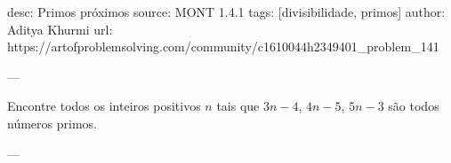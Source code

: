 desc: Primos próximos
source:  MONT 1.4.1
tags:  [divisibilidade, primos]
author:  Aditya Khurmi
url:  https://artofproblemsolving.com/community/c1610044h2349401_problem_141

---

Encontre todos os inteiros positivos $n$ tais que $3n - 4$, $4n - 5$, $5n - 3$ são todos números primos.

---

